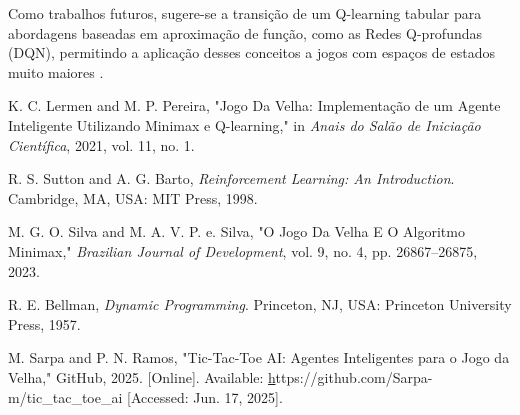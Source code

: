 \documentclass[conference]{IEEEtran}
\begin{document}
Como trabalhos futuros, sugere-se a transição de um Q-learning tabular para abordagens baseadas em aproximação de função, como as Redes Q-profundas (DQN), permitindo a aplicação desses conceitos a jogos com espaços de estados muito maiores \cite{lermen2021, sutton1998}.

\begin{thebibliography}{00}

K. C. Lermen and M. P. Pereira, "Jogo Da Velha: Implementação de um Agente Inteligente Utilizando Minimax e Q-learning," in \textit{Anais do Salão de Iniciação Científica}, 2021, vol. 11, no. 1.

R. S. Sutton and A. G. Barto, \textit{Reinforcement Learning: An Introduction}. Cambridge, MA, USA: MIT Press, 1998.

M. G. O. Silva and M. A. V. P. e. Silva, "O Jogo Da Velha E O Algoritmo Minimax," \textit{Brazilian Journal of Development}, vol. 9, no. 4, pp. 26867–26875, 2023.

R. E. Bellman, \textit{Dynamic Programming}. Princeton, NJ, USA: Princeton University Press, 1957.

M. Sarpa and P. N. Ramos, "Tic-Tac-Toe AI: Agentes Inteligentes para o Jogo da Velha," GitHub, 2025. [Online]. Available: \href{https://github.com/Sarpa-m/tic\_tac\_toe\_ai}https://github.com/Sarpa-m/tic\_tac\_toe\_ai  [Accessed: Jun. 17, 2025].

\end{thebibliography}

\end{document}
